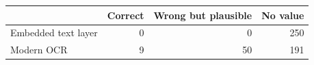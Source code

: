 \begin{tabular}{lrrr}
\toprule
 & Correct & Wrong but plausible & No value \\
\midrule
Embedded text layer & 0 & 0 & 250 \\
Modern OCR & 9 & 50 & 191 \\
\bottomrule
\end{tabular}
